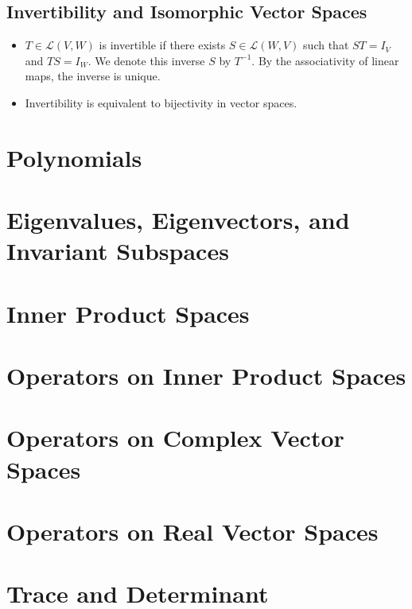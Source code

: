 \documentclass{article}
\newcommand{\LVW}{\mathcal{L}(V,W)}
\begin{document}
\subsection{Invertibility and Isomorphic Vector Spaces}
\begin{itemize}
    \item $T \in \LVW$ is invertible if there exists $S \in \mathcal{L}(W,V)$ such that $ST = I_V$ and $TS = I_W$. We denote this inverse $S$ by $T^{-1}$. By the associativity of linear maps, the inverse is unique.
    \item Invertibility is equivalent to bijectivity in vector spaces. 
\end{itemize}

\section{Polynomials}

\section{Eigenvalues, Eigenvectors, and Invariant Subspaces}

\section{Inner Product Spaces}

\section{Operators on Inner Product Spaces}

\section{Operators on Complex Vector Spaces}

\section{Operators on Real Vector Spaces}

\section{Trace and Determinant}
\end{document}
